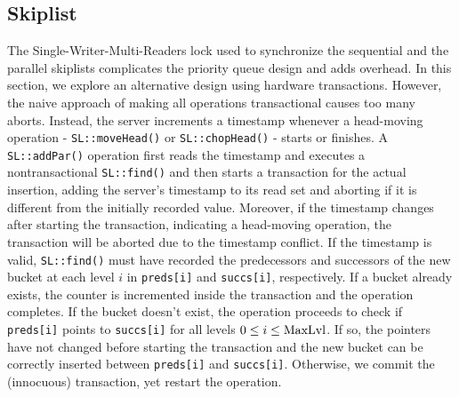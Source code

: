 \subsection{Skiplist}
\label{Sec-Transactions-SkipList}

The Single-Writer-Multi-Readers lock used to synchronize the sequential and the parallel skiplists complicates the priority queue design and adds overhead. In this section, we explore an alternative design using hardware transactions. 
However, the naive approach of making all operations transactional causes too many aborts. Instead, the server increments a timestamp whenever a head-moving operation - \texttt{SL::moveHead()} or \texttt{SL::chopHead()} - starts or finishes. A \texttt{SL::addPar()} operation first reads the timestamp and executes a nontransactional \texttt{SL::find()} and then starts a transaction for the actual insertion, adding the server's timestamp to its read set and aborting if it is different from the initially recorded value. Moreover, if the timestamp changes after starting the transaction, indicating a head-moving operation, the transaction will be aborted due to the timestamp conflict.  
If the timestamp is valid, \texttt{SL::find()} must have recorded the predecessors and successors of the new bucket at each level $i$ in \texttt{preds[i]} and \texttt{succs[i]}, respectively. If a bucket already exists, the counter is incremented inside the transaction and the operation completes. If the bucket doesn't exist, the operation proceeds to check if \texttt{preds[i]} points to \texttt{succs[i]} for all levels $0 \le i \le \mathrm{MaxLvl}$. If so, the pointers have not changed before starting the transaction and the new bucket can be correctly inserted between \texttt{preds[i]} and \texttt{succs[i]}. Otherwise, we commit the (innocuous) transaction, yet restart the operation.




